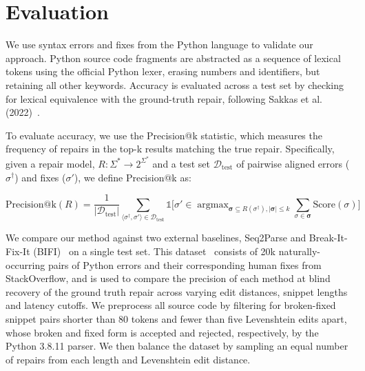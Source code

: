 \documentclass[runningheads]{llncs}
\DeclareMathOperator*{\argmax}{argmax}
\begin{document}
\section{Evaluation}

We use syntax errors and fixes from the Python language to validate our approach.  Python source code fragments are abstracted as a sequence of lexical tokens using the official Python lexer, erasing numbers and identifiers, but retaining all other keywords. Accuracy is evaluated across a test set by checking for lexical equivalence with the ground-truth repair, following Sakkas et al. (2022)~\cite{sakkas2022seq2parse}.

To evaluate accuracy, we use the Precision@k statistic, which measures the frequency of repairs in the top-k results matching the true repair. Specifically, given a repair model, $R: \Sigma^* \rightarrow 2^{\Sigma^*}$ and a test set $\mathcal{D}_{\text{test}}$ of pairwise aligned errors ($\sigma^\dagger$) and fixes ($\sigma'$), we define Precision@k as:

\begin{equation}
  \text{Precision@k}(R) = \frac{1}{|\mathcal{D}_{\text{test}}|}\sum_{\langle\sigma^\dagger, \sigma'\rangle \in \mathcal{D}_{\text{test}}} \mathds{1}\big[\sigma' \in \argmax_{\bm{\sigma} \subseteq R(\sigma^\dagger), |\bm{\sigma}| \leq k}\sum_{\sigma \in \bm{\sigma}}\text{Score}(\sigma)\big]
\end{equation}



We compare our method against two external baselines, Seq2Parse and Break-It-Fix-It (BIFI)~\cite{yasunaga2021break} on a single test set. This dataset~\cite{wong2019syntax} consists of 20k naturally-occurring pairs of Python errors and their corresponding human fixes from StackOverflow, and is used to compare the precision of each method at blind recovery of the ground truth repair across varying edit distances, snippet lengths and latency cutoffs. We preprocess all source code by filtering for broken-fixed snippet pairs shorter than 80 tokens and fewer than five Levenshtein edits apart, whose broken and fixed form is accepted and rejected, respectively, by the Python 3.8.11 parser. We then balance the dataset by sampling an equal number of repairs from each length and Levenshtein edit distance.
\end{document}
